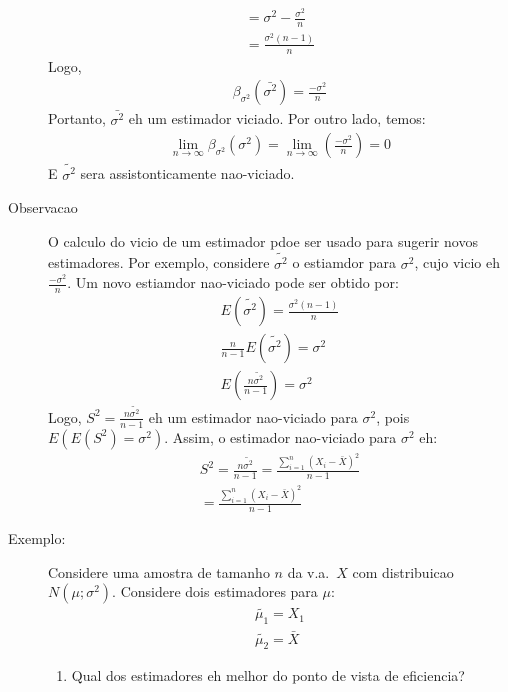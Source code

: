 \begin{description}
\begin{align*}
     = \sigma^2 - \frac{\sigma^2}{n}\\
     = \frac{\sigma^2 \left(n-1\right)}{n}
    \end{align*}
    Logo,
    \begin{align*}
      \beta_{\sigma^2}  \left(\bar{\sigma^2}\right)= \frac{-\sigma^2}{n}
    \end{align*}
    Portanto, $\bar{\sigma^2}$ eh um estimador viciado. Por outro lado, temos:
    \begin{align*}
      \lim \limits_{n \to \infty} \beta_{\sigma^2} \left(\sigma^2\right) = \lim \limits_{n \to \infty} \left( \frac{-\sigma^2}{n}\right)=0
    \end{align*}
    E $\tilde{\sigma^2}$ sera  assistonticamente nao-viciado.
  \item [Observacao] O calculo do vicio de um estimador pdoe ser usado para sugerir novos estimadores.
    Por exemplo, considere $\tilde{\sigma^2}$ o estiamdor para $\sigma^2$, cujo vicio eh $\frac{-\sigma^2}{n}$. 
    Um novo estiamdor nao-viciado pode ser obtido por:
    \begin{align*}
      E \left(\tilde{\sigma^2}\right) = \frac{\sigma^2 \left(n-1\right)}{n} \\
      \frac{n}{n-1} E \left(\tilde{\sigma^2}\right)= \sigma^2 \\
      E \left(\frac{n\tilde{\sigma^2}}{n-1}\right)= \sigma^2 
    \end{align*}
    Logo, $S^2= \frac{n \tilde{\sigma^2}}{n-1}$ eh um estimador nao-viciado para $\sigma^2$, pois $E  \left(E(S^2)= \sigma^2\right).$
    Assim, o estimador nao-viciado para $\sigma^2$ eh:
    \begin{align*}
      S^2= \frac{n \tilde{\sigma^2}}{n-1} = \frac{\sum \limits_{i=1}^{n} \left(X_i - \bar{X}\right)^2}{n-1} \\
      = \frac{\sum \limits_{i=1}^{n} \left(X_i - \bar{X}\right)^2}{n-1}
    \end{align*}
  \item [Exemplo:] Considere uma amostra de tamanho $n$ da v.a.\ $X$ com distribuicao $N \left(\mu; \sigma^2 \right)$.
    Considere dois estimadores para $\mu$:
    \begin{align*}
      \tilde{\mu_1} = X_1 \\
      \tilde{\mu_2}= \bar{X}
    \end{align*}
    \begin{enumerate}[label=(\alph*)]
      \item Qual dos estimadores eh melhor do ponto de vista de eficiencia?

\end{enumerate}
\end{description}
